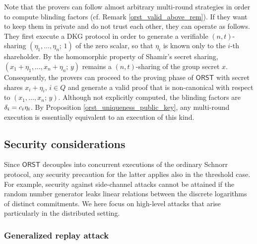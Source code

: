 \documentclass[10pt, psamsfonts, reqno]{amsart}
\theoremstyle{definition}
\theoremstyle{remark}
\numberwithin{equation}{section}
\begin{document}
Note that the provers can follow almost arbitrary
multi-round strategies
in order to compute blinding factors
(cf. Remark \ref{orst_valid_above_rem}).
If they want to keep them
in private and do not trust each other,
they can operate as follows.
They first execute a DKG protocol
in order to generate a verifiable $(n, t)$-sharing
$(\eta_1, \dots, \eta_n;\hspace{2pt} 1)$
of the zero scalar, so that $\eta_i$
is known only to the $i$-th shareholder.
By the homomorphic property of Shamir's secret sharing,
$(x_1 + \eta_1, \dots, x_n + \eta_n;\hspace{2pt} y)$
remains a $(n, t)$-sharing of the group secret $x$.
Consequently,
the provers can proceed to the proving phase of $\mathsf{ORST}$
with secret shares $x_i + \eta_i,\hspace{2pt} i \in Q$
and generate a valid proof that is
non-canonical with respect to $(x_1, \dots, x_n;\hspace{2pt} y)$.
Although not explicitly computed,
the blinding factors are
$\delta_i = c_i\hspace{0.5pt}\eta_i$.
By Proposition \ref{orst_uniqueness_public_key},
any multi-round execution is essentially equivalent
to an execution of this kind.

\subsection{Security considerations}

Since $\mathsf{ORST}$
decouples into concurrent executions
of the ordinary Schnorr protocol, any security precaution
for the latter applies also in the threshold case.
For example, security against side-channel attacks
cannot be attained if the random number generator
leaks linear relations between the discrete logarithms
of distinct commitments.
We here focus on high-level attacks that
arise particularly in the distributed setting.

\subsubsection{Generalized replay attack}\label{section_generalized_replay_attack}
\end{document}

